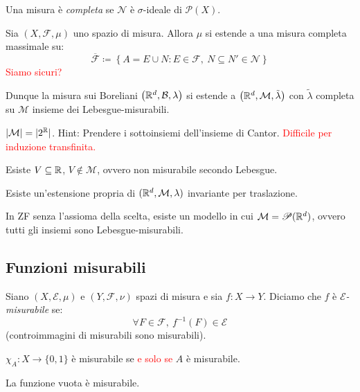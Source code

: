 \begin{definition}
	Una misura è \emph{completa} se $ \mathscr{N} $ è $ \sigma $-ideale di $ \mathscr{P}(X) $.
\end{definition}

\begin{thm}
	Sia $ (X,\mathcal{F},\mu) $ uno spazio di misura. Allora $ \mu $ si estende a una misura completa massimale su:
	\[ \overline{\mathcal{F}} \coloneqq \left\{ A = E \cup N : E\in \mathcal{F},\ N\subseteq N' \in \mathscr{N} \right\} \]
	\textcolor{red}{Siamo sicuri?}
\end{thm}
Dunque la misura sui Boreliani $\big(\mathbb{R}^d, \mathcal{B}, \lambda\big)$ si estende a $\big(\mathbb{R}^d, \mathcal{M}, \tilde\lambda \big)$ con $\tilde\lambda$ completa su \(\mathcal{M}\) insieme dei Lebesgue-misurabili.

\begin{exercise}
	$\left|\mathcal{M}\right|=|2^{\mathbb{R}}|$.
	Hint: Prendere i sottoinsiemi dell'insieme di Cantor. \textcolor{red}{Difficile per induzione transfinita.}
\end{exercise}
\begin{exercise}
	Esiste $V\subseteq \mathbb{R}$, $V\not\in \mathcal{M}$, ovvero non misurabile secondo Lebesgue.
\end{exercise}
\begin{exercise}
	Esiste un'estensione propria di $(\mathbb{R}^d, \mathcal{M}, \lambda)$ invariante per traslazione.
\end{exercise}
\begin{exercise}
	In ZF senza l'assioma della scelta, esiste un modello in cui $\mathcal{M}=\mathscr{P}(\mathbb{R}^d)$, ovvero tutti gli insiemi sono Lebesgue-misurabili.
\end{exercise}

\subsection{Funzioni misurabili}
\begin{definition}
	Siano $ (X,\mathcal{E},\mu) $ e $ (Y,\mathcal{F},\nu) $ spazi di misura e sia $ f\colon X\to Y $.
	Diciamo che $ f $ è \emph{$ \mathcal{E} $-misurabile} se:
	\[ \forall F \in \mathcal{F}, \ f^{-1}(F) \in \mathcal{E} \]
	(controimmagini di misurabili sono misurabili).
\end{definition}
\begin{exercise}
	$ \chi_A \colon X \to \{0,1\} $ è misurabile se \textcolor{red}{e solo se} $ A $ è misurabile.
\end{exercise}
\begin{oss}
	La funzione vuota è misurabile.
\end{oss}

